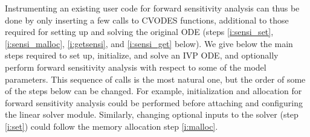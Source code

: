 Instrumenting an existing user code for forward sensitivity analysis can 
thus be done by only inserting a few calls to CVODES functions, additional
to those required for setting up and solving the original ODE
(steps \ref{i:sensi_set}, \ref{i:sensi_malloc}, \ref{i:getsensi}, 
and \ref{i:sensi_get} below).
We give below the main steps required to set up, initialize, and solve an 
IVP ODE, and optionally perform forward sensitivity analysis with respect 
to some of the model parameters. 
This sequence of calls is the most natural one, but the order of some of 
the steps below can be changed. 
For example, initialization and allocation for forward sensitivity analysis 
could be performed before attaching and configuring the linear solver module.
Similarly, changing optional inputs to the solver (step \ref{i:set}) could
follow the memory allocation step \ref{i:malloc}.
%
